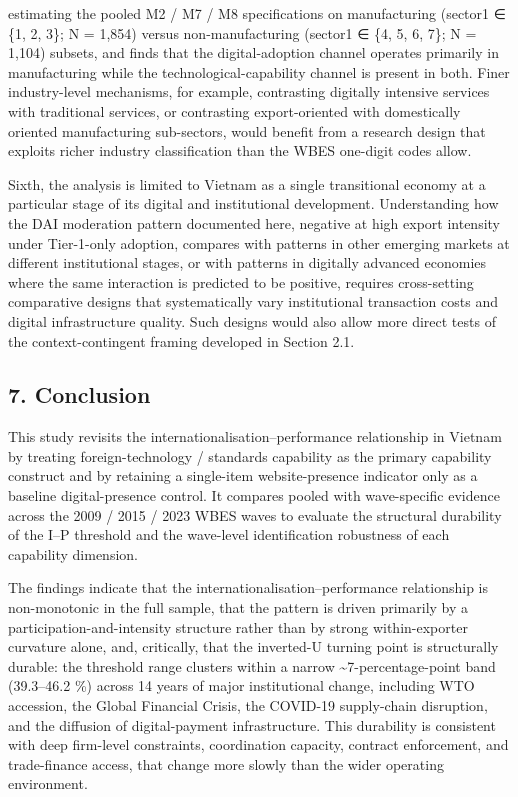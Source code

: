 \documentclass[12pt,a4paper]{article}
\begin{document}
estimating the pooled M2 / M7 / M8 specifications on manufacturing
(sector1 ∈ \{1, 2, 3\}; N = 1,854) versus non-manufacturing (sector1 ∈
\{4, 5, 6, 7\}; N = 1,104) subsets, and finds that the digital-adoption
channel operates primarily in manufacturing while the
technological-capability channel is present in both. Finer
industry-level mechanisms, for example, contrasting digitally intensive
services with traditional services, or contrasting export-oriented with
domestically oriented manufacturing sub-sectors, would benefit from a
research design that exploits richer industry classification than the
WBES one-digit codes allow.

Sixth, the analysis is limited to Vietnam as a single transitional
economy at a particular stage of its digital and institutional
development. Understanding how the DAI moderation pattern documented
here, negative at high export intensity under Tier-1-only adoption,
compares with patterns in other emerging markets at different
institutional stages, or with patterns in digitally advanced economies
where the same interaction is predicted to be positive, requires
cross-setting comparative designs that systematically vary institutional
transaction costs and digital infrastructure quality. Such designs would
also allow more direct tests of the context-contingent framing developed
in Section 2.1.

\hypertarget{7-conclusion}{%
\subsection{7. Conclusion}\label{7-conclusion}}

This study revisits the internationalisation--performance relationship
in Vietnam by treating foreign-technology / standards capability as the
primary capability construct and by retaining a single-item
website-presence indicator only as a baseline digital-presence control.
It compares pooled with wave-specific evidence across the 2009 / 2015 /
2023 WBES waves to evaluate the structural durability of the I--P
threshold and the wave-level identification robustness of each
capability dimension.

The findings indicate that the internationalisation--performance
relationship is non-monotonic in the full sample, that the pattern is
driven primarily by a participation-and-intensity structure rather than
by strong within-exporter curvature alone, and, critically, that the
inverted-U turning point is structurally durable: the threshold range
clusters within a narrow \textasciitilde7-percentage-point band
(39.3--46.2 \%) across 14 years of major institutional change, including
WTO accession, the Global Financial Crisis, the COVID-19 supply-chain
disruption, and the diffusion of digital-payment infrastructure. This
durability is consistent with deep firm-level constraints, coordination
capacity, contract enforcement, and trade-finance access, that change
more slowly than the wider operating environment.
\end{document}
